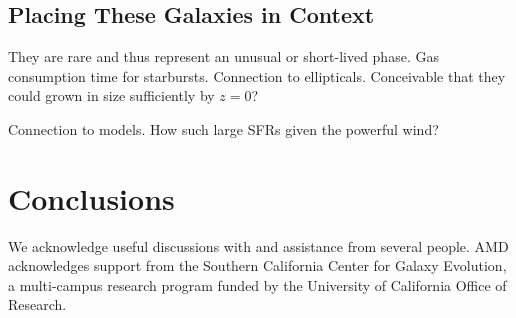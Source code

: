 \documentclass[apj]{emulateapj}
\begin{document}
\subsection{Placing These Galaxies in Context}

They are rare and thus represent an unusual or short-lived phase.  Gas
consumption time for starbursts.  Connection to ellipticals.
Conceivable that they could grown in size sufficiently by $z=0$?

Connection to models.  How such large SFRs given the powerful wind?  



\section{Conclusions}

\acknowledgments

We acknowledge useful discussions with and assistance from several
people.  AMD acknowledges support from the Southern California Center
for Galaxy Evolution, a multi-campus research program funded by the
University of California Office of Research.



\end{document}
